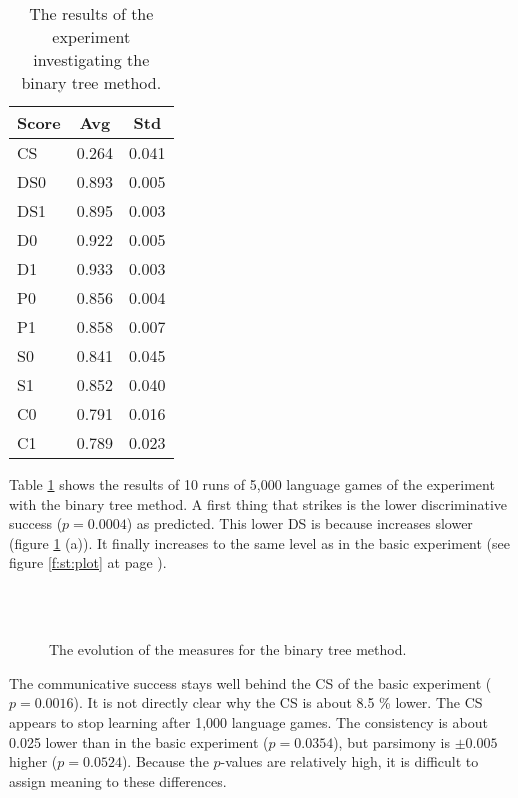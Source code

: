\begin{table}
\centering
\begin{tabular}{||l|c|c||}
\hline\hline
Score & Avg & Std\\\hline
CS & 0.264 & 0.041\\\hline
DS0 & 0.893 & 0.005\\\hline
DS1 & 0.895 & 0.003\\\hline
D0 & 0.922 & 0.005\\\hline
D1 & 0.933 & 0.003\\\hline
P0 & 0.856 & 0.004\\\hline
P1 & 0.858 & 0.007\\\hline
S0 & 0.841 & 0.045\\\hline
S1 & 0.852 & 0.040\\\hline
C0 & 0.791 & 0.016\\\hline
C1 & 0.789 & 0.023\\\hline
\hline
\end{tabular}
\caption{The results of the experiment investigating the binary tree method.}
\label{t:cat:bin}
\end{table}

Table \ref{t:cat:bin} shows the results of 10 runs of 5,000 language games of the experiment with the binary tree method. A first thing that strikes is the lower discriminative success ($p=0.0004$) as predicted. This lower DS is because increases slower (figure \ref{f:cat:bin} (a)). It finally increases to the same level as in the basic experiment (see figure \ref{f:st:plot} at page \pageref{f:st:plot}).

\begin{figure}
\centering
{}
\\
\\
\caption{The evolution of the measures for the binary tree method.}
\label{f:cat:bin}
\end{figure}

The communicative success stays well behind the CS of the basic experiment ($p=0.0016$). It is not directly clear why the CS is about 8.5 \% lower. The CS appears to stop learning after 1,000 language games. The consistency is about 0.025 lower than in the basic experiment ($p=0.0354$), but parsimony is $\pm 0.005$ higher ($p=0.0524$). Because the $p$-values are relatively high, it is difficult to assign meaning to these differences.

